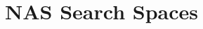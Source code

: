\renewcommand{\lecturetitle}{NAS Search Spaces}
\renewcommand{\lecturetime}{Week 9, Video 2}
\section{\lecturetitle}

